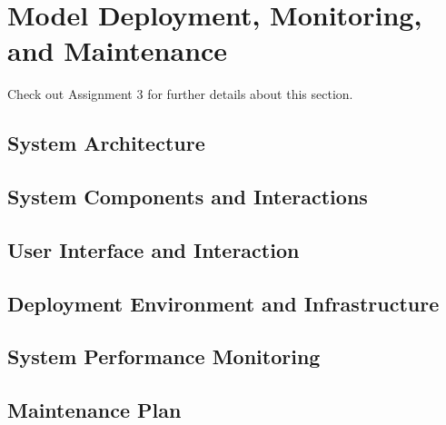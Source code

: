 \section{Model Deployment, Monitoring, and Maintenance}
Check out Assignment 3 for further details about this section.

\subsection{System Architecture}

\subsection{System Components and Interactions}

\subsection{User Interface and Interaction}

\subsection{Deployment Environment and Infrastructure}

\subsection{System Performance Monitoring}

\subsection{Maintenance Plan}